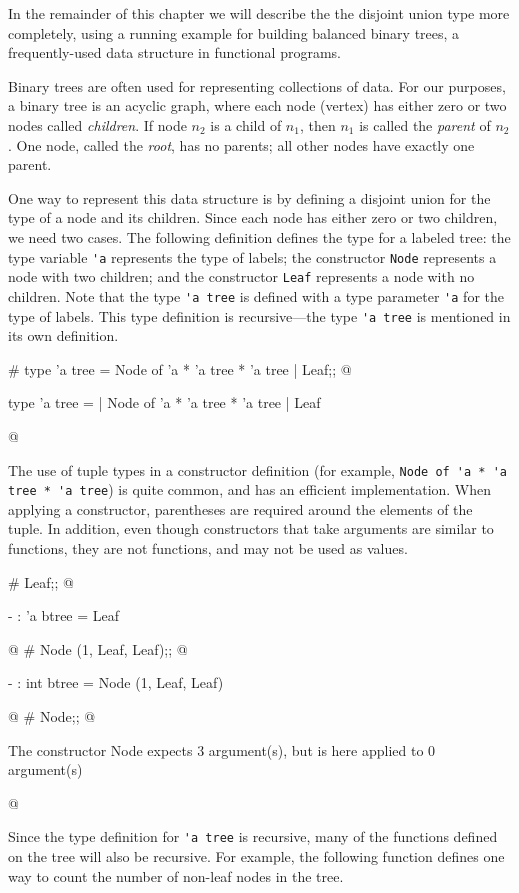 In the remainder of this chapter we will describe the the disjoint union
type more completely, using a running example for building balanced binary trees,
a frequently-used data structure in functional programs.


Binary trees are often used for representing
collections of data.  For our purposes, a binary tree is an acyclic graph,
where each node (vertex) has either zero or two nodes called
\emph{children}.  If node $n_2$ is a child of $n_1$, then $n_1$ is
called the \emph{parent} of $n_2$.  One node, called the \emph{root},
has no parents; all other nodes have exactly one parent.

One way to represent this data structure is by defining a disjoint
union for the type of a node and its children.  Since each node has
either zero or two children, we need two cases.  The following
definition defines the type for a labeled tree: the type variable \hbox{\lstinline/'a/}
represents the type of labels; the constructor \hbox{\lstinline/Node/}
represents a node with two children; and the constructor \hbox{\lstinline/Leaf/}
represents a node with no children.  Note that the type \hbox{\lstinline/'a tree/}
is defined with a type parameter \hbox{\lstinline/'a/} for the type of labels.
This type definition is recursive---the type \hbox{\lstinline/'a tree/}
is mentioned in its own definition.

\begin{ocaml}
# type 'a tree =
     Node of 'a * 'a tree * 'a tree
   | Leaf;;
@
\begin{topoutput}
type 'a tree = | Node of 'a * 'a tree * 'a tree | Leaf
\end{topoutput}
@
\end{ocaml}
%
The use of tuple types in a constructor definition (for example,
\hbox{\lstinline/Node of 'a * 'a tree * 'a tree/}) is quite common, and has an
efficient implementation.  When applying a constructor, parentheses
are required around the elements of the tuple.  In addition, even
though constructors that take arguments are similar to functions, they are
not functions, and may not be used as values.

\begin{ocaml}
# Leaf;;
@
\begin{topoutput}
- : 'a btree = Leaf
\end{topoutput}
@
# Node (1, Leaf, Leaf);;
@
\begin{topoutput}
- : int btree = Node (1, Leaf, Leaf)
\end{topoutput}
@
# Node;;
@
\begin{toperror}
The constructor Node expects 3 argument(s),
but is here applied to 0 argument(s)
\end{toperror}
@
\end{ocaml}
%
Since the type definition for \hbox{\lstinline/'a tree/} is recursive, many of the functions
defined on the tree will also be recursive.  For example, the following function
defines one way to count the number of non-leaf nodes in the tree.

